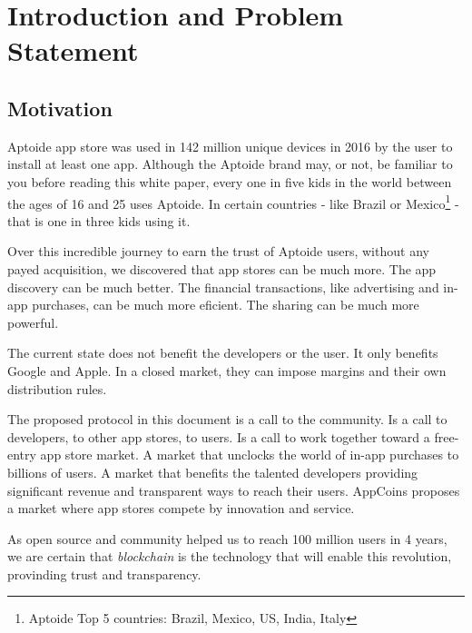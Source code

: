 


\section{Introduction and Problem Statement}
\label{sec: introduction}

\subsection{Motivation}




Aptoide app store was used in 142 million unique devices in 2016 by the user to install at least one app. Although the Aptoide brand may, or not, be familiar to you before reading this white paper, every one in five kids in the world between the ages of 16 and 25 uses Aptoide. In certain countries - like Brazil or Mexico\footnote{Aptoide Top 5 countries: Brazil, Mexico, US, India, Italy} - that is one in three kids using it. 

Over this incredible journey to earn the trust of Aptoide users, without any payed acquisition, we discovered that app stores can be much more. The app discovery can be much better. The financial transactions, like advertising and in-app purchases, can be much more eficient. The sharing can be much more powerful. 

The current state does not benefit the developers or the user. It only benefits Google and Apple. In a closed market, they can impose margins and their own distribution rules.

\medskip

The proposed protocol in this document is a call to the community. Is a call to developers, to other app stores, to users. Is a call to work together toward a free-entry app store market. A market that unclocks the world of in-app purchases to billions of users. A market that benefits the talented developers providing significant revenue and transparent ways to reach their users. AppCoins proposes a market where app stores compete by innovation and service.

As open source and community helped us to reach 100 million users in 4 years, we are certain that {\em blockchain} is the technology that will enable this revolution, provinding trust and transparency.

